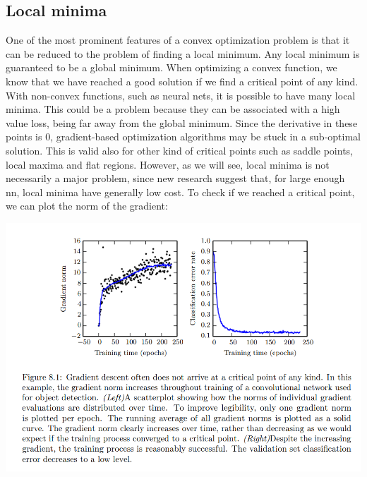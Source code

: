 \subsection{Local minima}
One of the most prominent features of a convex optimization problem is that it
can be reduced to the problem of finding a local minimum. Any local minimum is guaranteed to be a global minimum. When optimizing a convex function, we know that we have reached a good solution if we find a critical point of any kind. With non-convex functions, such as neural nets, it is possible to have many local minima. This could be a problem because they can be associated with a high value loss, being far away from the global minimum. Since the derivative in these points is 0, gradient-based optimization algorithms may be stuck in a sub-optimal solution. This is valid also for other kind of critical points such as saddle points, local maxima and flat regions. However, as we will see, local minima is not necessarily a major problem, since new research suggest that, for large enough nn, local minima have generally low cost.\newline\newline
To check if we reached a critical point, we can plot the norm of the gradient:
\begin{center}
    \includegraphics[scale=0.8]{images/Gradient norm.png}
\end{center}

